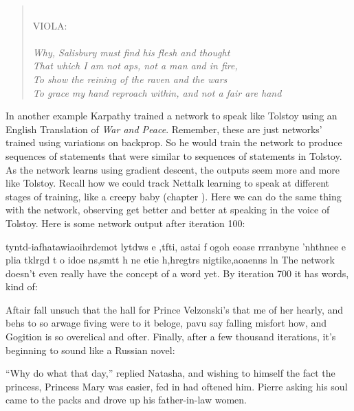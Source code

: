 \begin{quotation}
\hspace{5em} \\
VIOLA: \\ \\
\emph{Why, Salisbury must find his flesh and thought \\
That which I am not aps, not a man and in fire, \\
To show the reining of the raven and the wars \\
To grace my hand reproach within, and not a fair are hand}
\end{quotation}

In another example Karpathy trained a network to speak like Tolstoy using an English Translation of \emph{War and Peace}. Remember, these are just networks' trained using variations on backprop.  So he would train the network to produce sequences of statements that were similar to sequences of statements in Tolstoy. As the network learns using gradient descent, the outputs seem more and more like Tolstoy. Recall how we could track Nettalk learning to speak at different stages of training, like a creepy baby (chapter ). Here we can do the same thing with the network, observing get better and better at speaking in the voice of Tolstoy. Here is some network output after iteration 100:

\newenvironment{myquote}
  {\list{}{\leftmargin=0.3in\rightmargin=0.3in}\item[]}
  {\endlist}
\begin{myquote}
tyntd-iafhatawiaoihrdemot  lytdws  e ,tfti, astai f ogoh eoase rrranbyne 'nhthnee e 
plia tklrgd t o idoe ns,smtt   h ne etie h,hregtrs nigtike,aoaenns ln
\end{myquote}
The network doesn't even really have the concept of a word yet. By iteration 700 it has words, kind of:
\begin{myquote}
Aftair fall unsuch that the hall for Prince Velzonski's that me of
her hearly, and behs to so arwage fiving were to it beloge, pavu say falling misfort 
how, and Gogition is so overelical and ofter.
\end{myquote}
Finally, after a few thousand iterations, it's beginning to sound like a Russian novel:
\begin{myquote}
``Why do what that day,'' replied Natasha, and wishing to himself the fact the
princess, Princess Mary was easier, fed in had oftened him. Pierre asking his soul came to the packs and drove up his father-in-law women.
\end{myquote}

